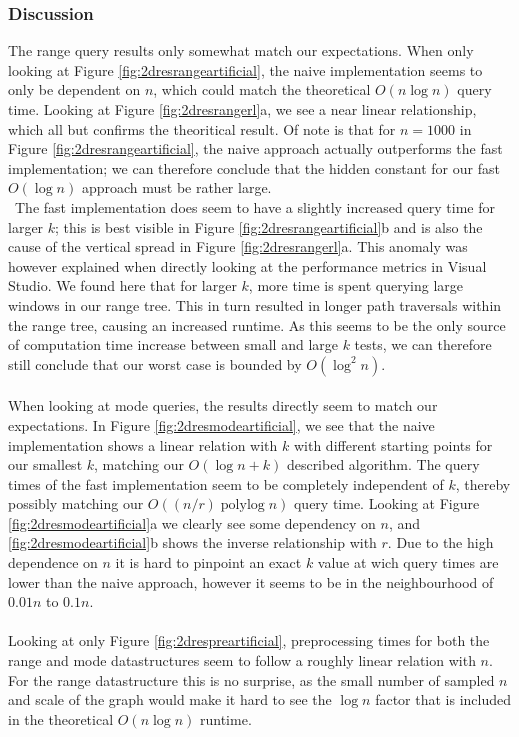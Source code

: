 \documentclass{article}
\newcommand{\fb}[1]{{#1}}
\DeclareMathOperator{\polylog}{polylog}
\begin{document}
\subsubsection*{Discussion}
\fb{The range query results only somewhat match our expectations. When only looking at Figure \ref{fig:2dresrangeartificial}, the naive implementation seems to only be dependent on $n$, which could match the theoretical $O(n \log n)$ query time. Looking at Figure \ref{fig:2dresrangerl}a, we see a near linear relationship, which all but confirms the theoritical result. Of note is that for $n=1000$ in Figure \ref{fig:2dresrangeartificial}, the naive approach actually outperforms the fast implementation; we can therefore conclude that the hidden constant for our fast $O(\log n)$ approach must be rather large. \\\
The fast implementation does seem to have a slightly increased query time for larger $k$; this is best visible in Figure \ref{fig:2dresrangeartificial}b and is also the cause of the vertical spread in Figure \ref{fig:2dresrangerl}a. This anomaly was however explained when directly looking at the performance metrics in Visual Studio. We found here that for larger $k$, more time is spent querying large windows in our range tree. This in turn resulted in longer path traversals within the range tree, causing an increased runtime. As this seems to be the only source of computation time increase between small and large $k$ tests, we can therefore still conclude that our worst case is bounded by $O(\log^2 n)$. \\\\
When looking at mode queries, the results directly seem to match our expectations. In Figure \ref{fig:2dresmodeartificial}, we see that the naive implementation shows a linear relation with $k$ with different starting points for our smallest $k$, matching our $O(\log n + k)$ described algorithm. The query times of the fast implementation seem to be completely independent of $k$, thereby possibly matching our $O((n/r) \polylog n)$ query time. Looking at Figure \ref{fig:2dresmodeartificial}a we clearly see some dependency on $n$, and \ref{fig:2dresmodeartificial}b shows the inverse relationship with $r$. Due to the high dependence on $n$ it is hard to pinpoint an exact $k$ value at wich query times are lower than the naive approach, however it seems to be in the neighbourhood of $0.01n$ to $0.1n$.\\\\
Looking at only Figure \ref{fig:2drespreartificial}, preprocessing times for both the range and mode datastructures seem to follow a roughly linear relation with $n$. For the range datastructure this is no surprise, as the small number of sampled $n$ and scale of the graph would make it hard to see the $\log n$ factor that is included in the theoretical $O(n \log n)$ runtime. \\
}
\end{document}
